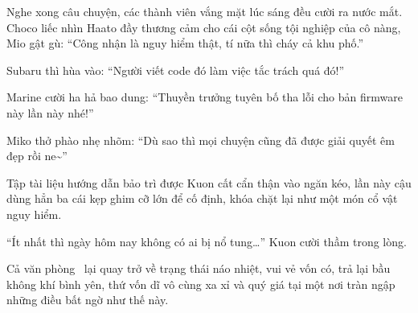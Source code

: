 \documentclass[../main.tex]{subfiles}
\begin{document}
Nghe xong câu chuyện, các thành viên vắng mặt lúc sáng đều cười ra nước mắt. Choco liếc nhìn Haato đầy thương cảm cho cái cột sống tội nghiệp của cô nàng, Mio gật gù: ``Công nhận là nguy hiểm thật, tí nữa thì cháy cả khu phố.''

Subaru thì hùa vào: ``Người viết code đó làm việc tắc trách quá đó!''

Marine cười ha hả bao dung: ``Thuyền trưởng tuyên bố tha lỗi cho bản firmware này lần này nhé!''

Miko thở phào nhẹ nhõm: ``Dù sao thì mọi chuyện cũng đã được giải quyết êm đẹp rồi ne\~{}''

Tập tài liệu hướng dẫn bảo trì được Kuon cất cẩn thận vào ngăn kéo, lần này cậu dùng hẳn ba cái kẹp ghim cỡ lớn để cố định, khóa chặt lại như một món cổ vật nguy hiểm.

``Ít nhất thì ngày hôm nay không có ai bị nổ tung\dots'' Kuon cười thầm trong lòng.

Cả văn phòng \hll\ lại quay trở về trạng thái náo nhiệt, vui vẻ vốn có, trả lại bầu không khí bình yên, thứ vốn dĩ vô cùng xa xỉ và quý giá tại một nơi tràn ngập những điều bất ngờ như thế này.
\end{document}
